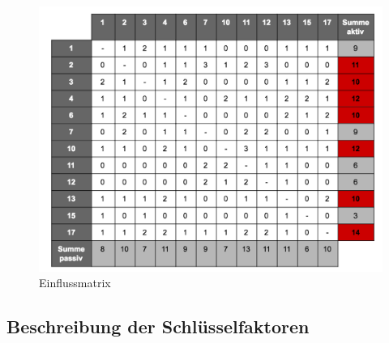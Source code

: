 \begin{figure}
	\centering
	\includegraphics[width=\linewidth]{images/matrix}
	\caption[Caption for parameters]{Einflussmatrix}
	\label{fig:matrix}
\end{figure}

\subsection{Beschreibung der Schlüsselfaktoren}

